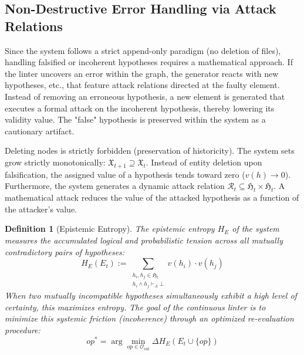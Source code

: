 \documentclass[11pt, a4paper]{article}
\newtheorem{definition}{Definition}
\begin{document}
	\subsection{Non-Destructive Error Handling via Attack Relations} Since the system follows a strict append-only paradigm (no deletion of files), handling falsified or incoherent hypotheses requires a mathematical approach. If the linter uncovers an error within the graph, the generator reacts with new hypotheses, etc., that feature attack relations directed at the faulty element. Instead of removing an erroneous hypothesis, a new element is generated that executes a formal attack on the incoherent hypothesis, thereby lowering its validity value. The "false" hypothesis is preserved within the system as a cautionary artifact.
	
	Deleting nodes is strictly forbidden (preservation of historicity). The system sets grow strictly monotonically: $\mathfrak{X}_{t+1} \supseteq \mathfrak{X}_t$. Instead of entity deletion upon falsification, the assigned value of a hypothesis tends toward zero ($v(h) \to 0$). Furthermore, the system generates a dynamic attack relation $\mathcal{R}_t \subseteq \mathfrak{H}_t \times \mathfrak{H}_t$. A mathematical attack reduces the value of the attacked hypothesis as a function of the attacker's value.
	
	\begin{definition}[Epistemic Entropy]
		The \emph{epistemic entropy} $H_E$ of the system measures the accumulated logical and probabilistic tension across all mutually contradictory pairs of hypotheses:
		\[
		H_E(E_t) := \sum_{\substack{h_i, h_j \in \mathfrak{H}_t \\ h_i \land h_j \vdash_{A} \bot}} v(h_i) \cdot v(h_j)
		\]
		When two mutually incompatible hypotheses simultaneously exhibit a high level of certainty, this maximizes entropy. The goal of the continuous linter is to minimize this systemic friction (incoherence) through an optimized re-evaluation procedure:
		\[
		op^* = \arg\min_{op \in \mathcal{O}_{val}} \Delta H_E(E_t \cup \{op\})
		\]
	\end{definition}
	
\end{document}
